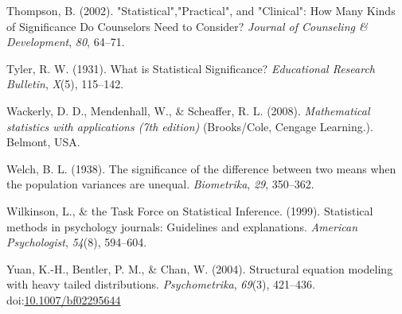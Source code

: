 \documentclass[
  man,floatsintext]{apa6}
\begin{document}
\leavevmode\hypertarget{ref-Thompson_2002}{}%
Thompson, B. (2002). "Statistical","Practical", and "Clinical": How Many Kinds of Significance Do Counselors Need to Consider? \emph{Journal of Counseling \& Development}, \emph{80}, 64--71.

\leavevmode\hypertarget{ref-Tyler_1931}{}%
Tyler, R. W. (1931). What is Statistical Significance? \emph{Educational Research Bulletin}, \emph{X}(5), 115--142.

\leavevmode\hypertarget{ref-Wackerly_et_al_2008}{}%
Wackerly, D. D., Mendenhall, W., \& Scheaffer, R. L. (2008). \emph{Mathematical statistics with applications (7th edition)} (Brooks/Cole, Cengage Learning.). Belmont, USA.

\leavevmode\hypertarget{ref-Welch_1938}{}%
Welch, B. L. (1938). The significance of the difference between two means when the population variances are unequal. \emph{Biometrika}, \emph{29}, 350--362.

\leavevmode\hypertarget{ref-Wilkinson_1999}{}%
Wilkinson, L., \& the Task Force on Statistical Inference. (1999). Statistical methods in psychology journals: Guidelines and explanations. \emph{American Psychologist}, \emph{54}(8), 594--604.

\leavevmode\hypertarget{ref-Yuan_et_al_2004}{}%
Yuan, K.-H., Bentler, P. M., \& Chan, W. (2004). Structural equation modeling with heavy tailed distributions. \emph{Psychometrika}, \emph{69}(3), 421--436. doi:\href{https://doi.org/10.1007/bf02295644}{10.1007/bf02295644}

\clearpage
\makeatletter
\efloat@restorefloats
\makeatother
\end{document}

